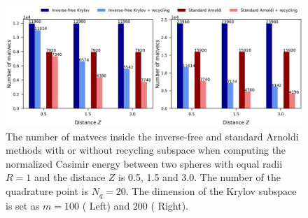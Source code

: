     \begin{figure}[H]
        \centering
        \includegraphics[width = \textwidth]{figures/Num_matvec.png}
        \caption{The number of matvecs inside the inverse-free and standard Arnoldi methods with or without recycling subspace when 
        computing the normalized Casimir energy between two spheres with equal radii $R = 1$ and the distance $Z$ is 0.5, 1.5 and 3.0. 
        The number of the quadrature point is $N_q = 20$. The dimension of the Krylov subspace is set as $m = 100$ ({\color{gray} Left}) and 
        $200$ ({\color{gray} Right}).}
        \label{fig:Num_matvec}
    \end{figure}


